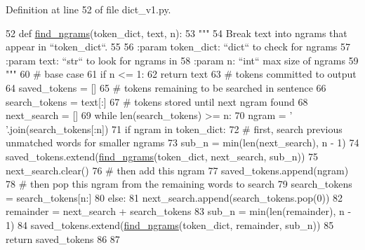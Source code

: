 Definition at line 52 of file dict\+\_\+v1.\+py.


\begin{DoxyCode}
52 \textcolor{keyword}{def }\hyperlink{namespaceparlai_1_1agents_1_1legacy__agents_1_1seq2seq_1_1dict__v1_ac37e7654855b4cdf9b8a6cb1a2193a17}{find\_ngrams}(token\_dict, text, n):
53     \textcolor{stringliteral}{"""}
54 \textcolor{stringliteral}{    Break text into ngrams that appear in ``token\_dict``.}
55 \textcolor{stringliteral}{}
56 \textcolor{stringliteral}{    :param token\_dict: ``dict`` to check for ngrams}
57 \textcolor{stringliteral}{    :param text: ``str`` to look for ngrams in}
58 \textcolor{stringliteral}{    :param n: ``int`` max size of ngrams}
59 \textcolor{stringliteral}{    """}
60     \textcolor{comment}{# base case}
61     \textcolor{keywordflow}{if} n <= 1:
62         \textcolor{keywordflow}{return} text
63     \textcolor{comment}{# tokens committed to output}
64     saved\_tokens = []
65     \textcolor{comment}{# tokens remaining to be searched in sentence}
66     search\_tokens = text[:]
67     \textcolor{comment}{# tokens stored until next ngram found}
68     next\_search = []
69     \textcolor{keywordflow}{while} len(search\_tokens) >= n:
70         ngram = \textcolor{stringliteral}{' '}.join(search\_tokens[:n])
71         \textcolor{keywordflow}{if} ngram \textcolor{keywordflow}{in} token\_dict:
72             \textcolor{comment}{# first, search previous unmatched words for smaller ngrams}
73             sub\_n = min(len(next\_search), n - 1)
74             saved\_tokens.extend(\hyperlink{namespaceparlai_1_1agents_1_1legacy__agents_1_1seq2seq_1_1dict__v1_ac37e7654855b4cdf9b8a6cb1a2193a17}{find\_ngrams}(token\_dict, next\_search, sub\_n))
75             next\_search.clear()
76             \textcolor{comment}{# then add this ngram}
77             saved\_tokens.append(ngram)
78             \textcolor{comment}{# then pop this ngram from the remaining words to search}
79             search\_tokens = search\_tokens[n:]
80         \textcolor{keywordflow}{else}:
81             next\_search.append(search\_tokens.pop(0))
82     remainder = next\_search + search\_tokens
83     sub\_n = min(len(remainder), n - 1)
84     saved\_tokens.extend(\hyperlink{namespaceparlai_1_1agents_1_1legacy__agents_1_1seq2seq_1_1dict__v1_ac37e7654855b4cdf9b8a6cb1a2193a17}{find\_ngrams}(token\_dict, remainder, sub\_n))
85     \textcolor{keywordflow}{return} saved\_tokens
86 
87 
\end{DoxyCode}
\mbox{\label{namespaceparlai_1_1agents_1_1legacy__agents_1_1seq2seq_1_1dict__v1_affad139ddec76996dc9a93f6123d545e}} 
